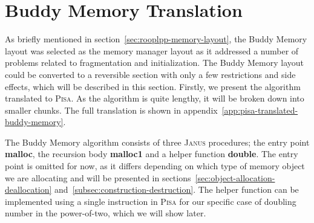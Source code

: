 \section{Buddy Memory Translation}
\label{sec:buddy-memory-translation}
As briefly mentioned in section~\ref{sec:rooplpp-memory-layout}, the Buddy Memory layout was selected as the memory manager layout as it addressed a number of problems related to fragmentation and initialization. The Buddy Memory layout could be converted to a reversible section with only a few restrictions and side effects, which will be described in this section. Firstly, we present the algorithm translated to \textsc{Pisa}. As the algorithm is quite lengthy, it will be broken down into smaller chunks. The full translation is shown in appendix~\ref{app:pisa-translated-buddy-memory}.

The Buddy Memory algorithm consists of three \textsc{Janus} procedures; the entry point \textbf{malloc}, the recursion body \textbf{malloc1} and a helper function \textbf{double}. The entry point is omitted for now, as it differs depending on which type of memory object we are allocating and will be presented in sections~\ref{sec:object-allocation-deallocation} and~\ref{subsec:construction-destruction}. The helper function can be implemented using a single instruction in \textsc{Pisa} for our specific case of doubling number in the power-of-two, which we will show later. 

